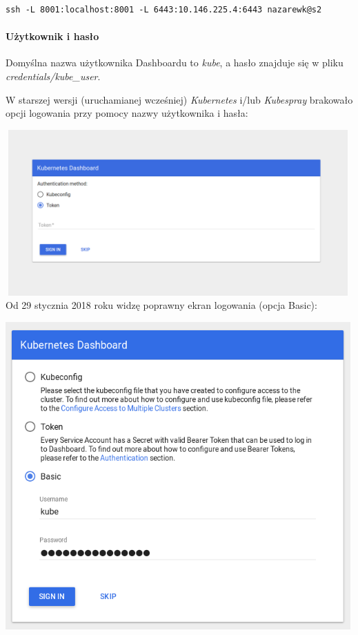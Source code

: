 \documentclass[a4paper,12pt,twoside,openany]{report}
\begin{document}
\begin{lstlisting}
ssh -L 8001:localhost:8001 -L 6443:10.146.225.4:6443 nazarewk@s2
\end{lstlisting}

\hypertarget{uux17cytkownik-i-hasux142o}{%
\paragraph{Użytkownik i hasło}\label{uux17cytkownik-i-hasux142o}}

Domyślna nazwa użytkownika Dashboardu to \emph{kube}, a hasło znajduje
się w pliku \emph{credentials/kube\_user}.

W starszej wersji (uruchamianej wcześniej) \emph{Kubernetes} i/lub
\emph{Kubespray} brakowało opcji logowania przy pomocy nazwy użytkownika
i hasła:

\includegraphics[width=5.20833in,height=2.5in]{assets/dashboard-login-old.png}\\
Od 29 stycznia 2018 roku widzę poprawny ekran logowania (opcja Basic):

\includegraphics[width=5.20833in,height=4.63542in]{assets/dashboard-login-new.png}\\
\end{document}
